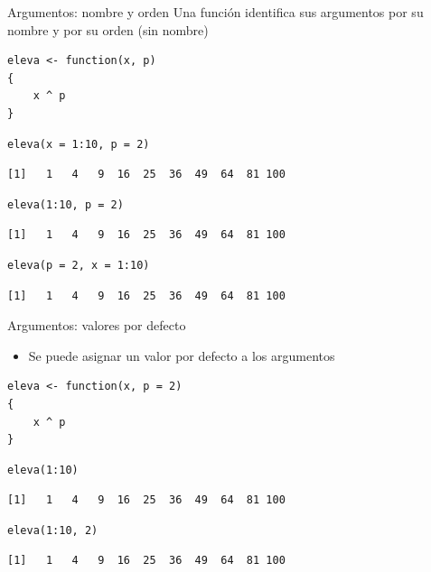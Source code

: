 \documentclass[xcolor={usenames,svgnames,dvipsnames}]{beamer}
\begin{document}
\begin{frame}[fragile,label={sec:org1a42eae}]{Argumentos: nombre y orden}
 Una función identifica sus argumentos por su nombre y por su orden (sin nombre)

\lstset{language=r,label= ,caption= ,captionpos=b,numbers=none}
\begin{lstlisting}
eleva <- function(x, p)
{
    x ^ p
}
\end{lstlisting}

\lstset{language=r,label= ,caption= ,captionpos=b,numbers=none}
\begin{lstlisting}
eleva(x = 1:10, p = 2)
\end{lstlisting}

\begin{verbatim}
[1]   1   4   9  16  25  36  49  64  81 100
\end{verbatim}

\lstset{language=r,label= ,caption= ,captionpos=b,numbers=none}
\begin{lstlisting}
eleva(1:10, p = 2)
\end{lstlisting}

\begin{verbatim}
[1]   1   4   9  16  25  36  49  64  81 100
\end{verbatim}

\lstset{language=r,label= ,caption= ,captionpos=b,numbers=none}
\begin{lstlisting}
eleva(p = 2, x = 1:10)
\end{lstlisting}

\begin{verbatim}
[1]   1   4   9  16  25  36  49  64  81 100
\end{verbatim}
\end{frame}

\begin{frame}[fragile,label={sec:org418bb9a}]{Argumentos: valores por defecto}
 \begin{itemize}
\item Se puede asignar un valor por defecto a los argumentos
\end{itemize}
\lstset{language=r,label= ,caption= ,captionpos=b,numbers=none}
\begin{lstlisting}
eleva <- function(x, p = 2)
{
    x ^ p
}
\end{lstlisting}

\lstset{language=r,label= ,caption= ,captionpos=b,numbers=none}
\begin{lstlisting}
eleva(1:10)
\end{lstlisting}

\begin{verbatim}
[1]   1   4   9  16  25  36  49  64  81 100
\end{verbatim}

\lstset{language=r,label= ,caption= ,captionpos=b,numbers=none}
\begin{lstlisting}
eleva(1:10, 2)
\end{lstlisting}

\begin{verbatim}
[1]   1   4   9  16  25  36  49  64  81 100
\end{verbatim}
\end{frame}
\end{document}
